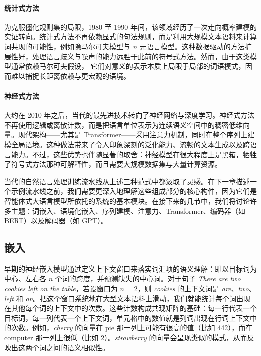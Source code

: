 \paragraph{统计式方法} 为克服僵化规则集的局限，1980 至 1990 年间，该领域经历了一次走向概率建模的实证转向。统计式方法不再依赖显式的句法规则，而是利用大规模文本语料来计算词共现的可能性，例如隐马尔可夫模型与 $n$ 元语言模型。这种数据驱动的方法扩展性好，处理语言歧义与噪声的能力远胜于此前的符号式方法。然而，由于这类模型通常依赖马尔可夫假设， %
它们对意义的表示本质上局限于局部的词语模式，因而难以捕捉长距离依赖与更宏观的语境。

\paragraph{神经式方法} 大约在 2010 年之后，当代的最先进技术转向了神经网络与深度学习。神经式方法不再使用逻辑或离散计数，而是把语言单位表示为连续语义空间中的稠密低维向量。现代架构——尤其是 Transformer——采用注意力机制，同时在整个序列上建模全局语境。这种做法带来了令人印象深刻的泛化能力、流畅的文本生成以及跨语言能力。不过，这些优势也伴随显著的取舍：神经模型在很大程度上是黑箱，牺牲了符号式方法那种可解释性，而且需要大规模数据集与大量计算资源。

当代的自然语言处理训练流水线从上述三种范式中都汲取了灵感。在下一章描述一个示例流水线之前，我们需要更深入地理解这些组成部分的核心构件，因为它们是智能体式大语言模型所依托的系统的基本模块。在接下来的几节中，我们将讨论许多主题：词嵌入、语境化嵌入、序列建模、注意力、Transformer、编码器（如 BERT）以及解码器（如 GPT）。  

\subsection{嵌入}\label{sec:cosine}
早期的神经嵌入模型通过定义上下文窗口来落实词汇项的语义理解：即以目标词为中心、左右各 $n$ 个词的跨度，并预测缺失的中心词。对于句子 \textit{There are two cookies left on the table}，若设窗口为 $n=2$，则 \textit{cookies} 的上下文词是 \textit{are}、\textit{two}、\textit{left} 和 \textit{on}。把这个窗口系统地在大型文本语料上滑动，我们就能统计每个词出现在其他每个词的上下文中的次数。这些计数构成共现矩阵的基础：每一行代表一个目标词，每一列代表一个上下文词，单元格中的数值就是列词出现在行词上下文中的次数。例如，\textit{cherry} 的向量在 pie 那一列上可能有很高的值（比如 442），而在 computer 那一列上很低（比如 2）。\textit{strawberry} 的向量会呈现类似的模式，从而反映出这两个词之间的语义相似性。

